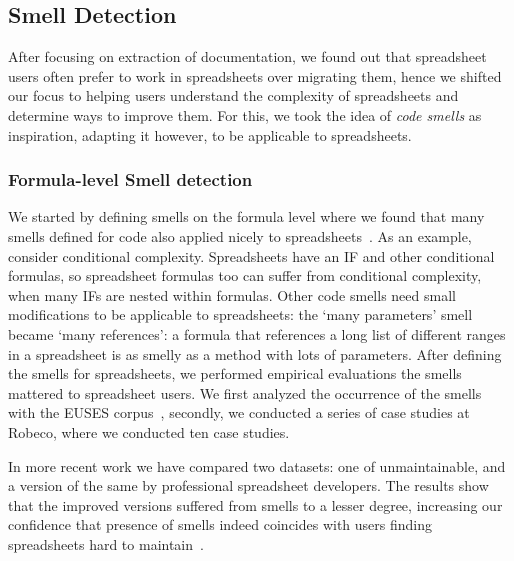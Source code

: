 \documentclass[conference]{IEEEtran}
\begin{document}
\subsection{Smell Detection} 
After focusing on extraction of documentation, we found out that spreadsheet users often prefer to work in spreadsheets over migrating them, hence we shifted our focus to helping users understand the complexity of spreadsheets and determine ways to improve them. For this, we took the idea of \emph{code smells} as inspiration, adapting it however, to be applicable to spreadsheets. 

\subsubsection{Formula-level Smell detection}
We started by defining smells on the formula level where we found that many smells defined for code also applied nicely to spreadsheets~\cite{hermans_detecting_2014}. As an example, consider conditional complexity. Spreadsheets have an IF and other conditional formulas, so spreadsheet formulas too can suffer from conditional complexity, when many IFs are nested within formulas. Other code smells need small modifications to be applicable to spreadsheets: the `many parameters' smell became `many references': a formula that references a long list of different ranges in a spreadsheet is as smelly as a method with lots of parameters. After defining the smells for spreadsheets, we performed empirical evaluations  the smells mattered to spreadsheet users. We first analyzed the occurrence of the smells with the EUSES corpus~\cite{fisher_euses_2005}, secondly, we conducted a series of case studies at Robeco, where we conducted ten case studies. 

In more recent work we have compared two datasets: one of  unmaintainable, and a version of the same  by professional spreadsheet developers. The results show that the improved versions suffered from smells to a lesser degree, increasing our confidence that presence of smells indeed coincides with users finding spreadsheets hard to maintain~\cite{Jansen2015}.
\end{document}
